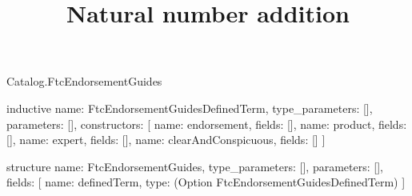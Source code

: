 \begin{lexlean}{Catalog.FtcEndorsementGuides}
\title{Natural number addition}
\begin{semanticmodule}
inductive{
  name: FtcEndorsementGuidesDefinedTerm,
  type_parameters: [],
  parameters: [],
  constructors: [
    {name: endorsement, fields: []},
    {name: product, fields: []},
    {name: expert, fields: []},
    {name: clearAndConspicuous, fields: []}
  ]
}

structure{
  name: FtcEndorsementGuides,
  type_parameters: [],
  parameters: [],
  fields: [
    {name: definedTerm, type: (Option FtcEndorsementGuidesDefinedTerm)}
  ]
}
\end{semanticmodule}
\end{lexlean}
